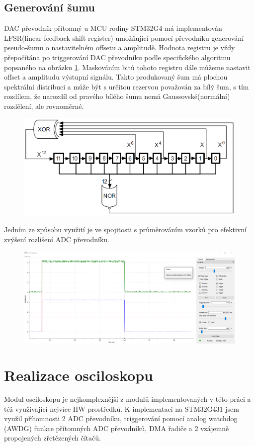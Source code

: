 \subsection{Generování šumu}
DAC převodník přítomný u MCU rodiny STM32G4 má implementován LFSR(linear feedback shift
register) umožňující pomocí převodníku generování pseudo-šumu o nastavitelném offsetu a amplitudě. Hodnota registru je vždy přepočítána po triggerování DAC převodníku podle specifického algoritmu popsaného na obrázku \ref{fig:noiselfsrcalculation}. Maskováním bitů tohoto registru dále můžeme nastavit offset a amplitudu výstupní signálu. Takto produkovaný šum má plochou spektrální distribuci a může být s určitou rezervou považován za bílý šum, s tím rozdílem, že narozdíl od pravého bílého šumu nemá Gaussovské(normální) rozdělení, ale rovnoměrné.
\begin{figure}
	\centering
	\includegraphics[width=0.7\linewidth]{Figs/Diagrams/NOISE_LFSR_Calculation}
	\caption{}
	\label{fig:noiselfsrcalculation}
\end{figure}

Jedním ze způsobu využití je ve spojitosti s průměrováním vzorků pro efektivní zvýšení rozlišení ADC převodníku. 
\begin{figure}
	\centering
	\includegraphics[width=0.7\linewidth]{Figs/Graphs/Noise}
	\caption{}
	\label{fig:noise}
\end{figure}

\section{Realizace osciloskopu}
Modul osciloskopu je nejkomplexnější z modulů implementovaných v této práci a též využívající nejvíce HW prostředků. K implementaci na STM32G431 jsem využil přítomnosti 2 ADC převodníku, triggerování pomocí analog watchdog (AWDG) funkce přítomných ADC převodníků, DMA řadiče a 2 vzájemně propojených zřetězených čítačů.
